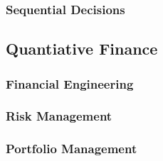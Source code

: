\documentclass{article}
\theoremstyle{definition}
\theoremstyle{remark}
\begin{document}
\subsubsection{Sequential Decisions}

\subsection{Quantiative Finance}

\subsubsection{Financial Engineering}

\subsubsection{Risk Management}

\subsubsection{Portfolio Management}
\end{document}
